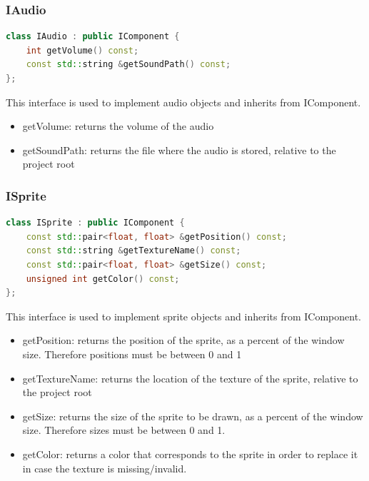 \documentclass[12pt]{article}
\begin{document}
\subsubsection{IAudio}
\begin{lstlisting}[language=c++]
class IAudio : public IComponent {
    int getVolume() const;
	const std::string &getSoundPath() const;
};
\end{lstlisting}
This interface is used to implement audio objects and inherits from IComponent.
\begin{itemize}
    \item getVolume: returns the volume of the audio
    \item getSoundPath: returns the file where the audio is stored, relative to the project root
\end{itemize}
\subsubsection{ISprite}
\begin{lstlisting}[language=c++]
class ISprite : public IComponent {
	const std::pair<float, float> &getPosition() const;
	const std::string &getTextureName() const;
	const std::pair<float, float> &getSize() const;
	unsigned int getColor() const;
};
\end{lstlisting}
This interface is used to implement sprite objects and inherits from IComponent.
\begin{itemize}
    \item getPosition: returns the position of the sprite, as a percent of the window size. Therefore positions must be between 0 and 1
    \item getTextureName: returns the location of the texture of the sprite, relative to the project root
    \item getSize: returns the size of the sprite to be drawn, as a percent of the window size. Therefore sizes must be between 0 and 1.
    \item getColor: returns a color that corresponds to the sprite in order to replace it in case the texture is missing/invalid.
\end{itemize}
\newpage
\end{document}
